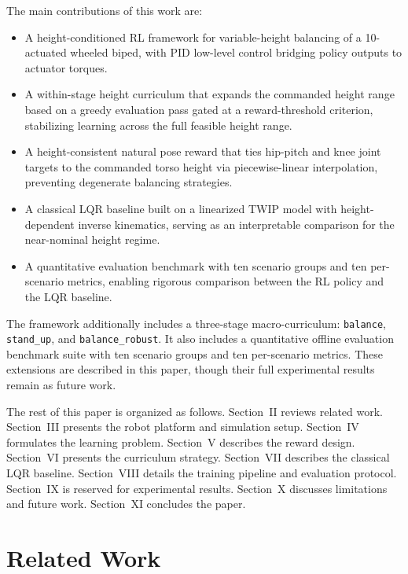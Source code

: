 \documentclass[conference]{IEEEtran}
\begin{document}
The main contributions of this work are:
\begin{itemize}
    \item A height-conditioned RL framework for variable-height balancing of
    a 10-actuated wheeled biped, with PID low-level control bridging policy
    outputs to actuator torques.
    \item A within-stage height curriculum that expands the commanded height
    range based on a greedy evaluation pass gated at a reward-threshold criterion,
    stabilizing learning across the full feasible height range.
    \item A height-consistent natural pose reward that ties hip-pitch and knee
    joint targets to the commanded torso height via piecewise-linear
    interpolation, preventing degenerate balancing strategies.
    \item A classical LQR baseline built on a linearized TWIP model with
    height-dependent inverse kinematics, serving as an interpretable
    comparison for the near-nominal height regime.
    \item A quantitative evaluation benchmark with ten scenario groups and
    ten per-scenario metrics, enabling rigorous comparison between the RL
    policy and the LQR baseline.
\end{itemize}

The framework additionally includes a three-stage macro-curriculum:
\texttt{balance}, \texttt{stand\_up}, and \texttt{balance\_robust}.
It also includes a quantitative offline evaluation benchmark suite with
ten scenario groups and ten per-scenario metrics.
These extensions are described in this paper, though their full experimental
results remain as future work.

The rest of this paper is organized as follows.
Section~II reviews related work.
Section~III presents the robot platform and simulation setup.
Section~IV formulates the learning problem.
Section~V describes the reward design.
Section~VI presents the curriculum strategy.
Section~VII describes the classical LQR baseline.
Section~VIII details the training pipeline and evaluation protocol.
Section~IX is reserved for experimental results.
Section~X discusses limitations and future work.
Section~XI concludes the paper.

\section{Related Work}
\label{sec:related}
\end{document}
